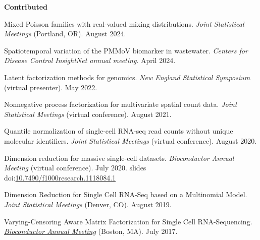 \documentclass[10pt]{article}
\newcommand\doilink[1]{\href{https://dx.doi.org/#1}{#1}}
\newcommand\doi[1]{doi:\doilink{#1}}
\begin{document}
\textbf{Contributed}
\begin{enumerate}[label= {[\arabic*]}]
\item Mixed Poisson families with real-valued mixing distributions. {\it Joint Statistical Meetings} (Portland, OR). August 2024.
\item Spatiotemporal variation of the PMMoV biomarker in wastewater. {\it Centers for Disease Control InsightNet annual meeting}. April 2024.
\item Latent factorization methods for genomics. {\it New England Statistical Symposium} (virtual presenter). May 2022.
\item Nonnegative process factorization for multivariate spatial count data. {\it Joint Statistical Meetings} (virtual conference). August 2021.
\item Quantile normalization of single-cell RNA-seq read counts without unique molecular identifiers. {\it Joint Statistical Meetings} (virtual conference). August 2020.
\item Dimension reduction for massive single-cell datasets. {\it Bioconductor Annual Meeting} (virtual conference). July 2020. slides \doi{10.7490/f1000research.1118084.1}
\item Dimension Reduction for Single Cell RNA-Seq based on a Multinomial Model. {\it Joint Statistical Meetings} (Denver, CO). August 2019.
\item Varying-Censoring Aware Matrix Factorization for Single Cell RNA-Sequencing. \href{https://www.bioconductor.org/help/course-materials/2017/BioC2017/}{{\it Bioconductor Annual Meeting}} (Boston, MA). July 2017.
\end{enumerate}
\end{document}
